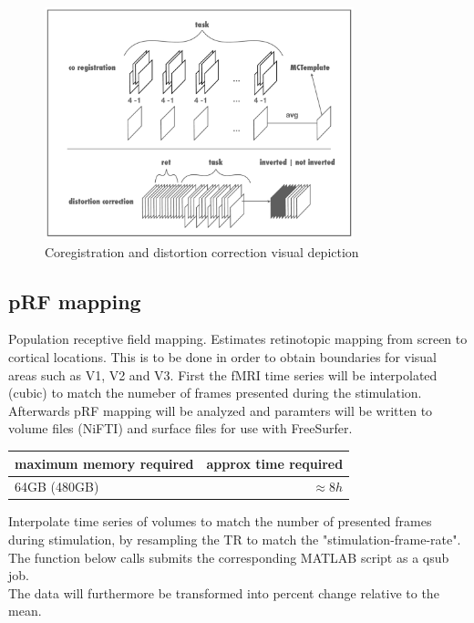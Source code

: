 \documentclass[12pt,a4paper]{scrartcl}
\begin{document}
\begin{figure}
\begin{center}
\includegraphics[width=0.8\textwidth]{coregdist}
\caption[Coregistration and distortion correction visual depiction]{Coregistration and distortion correction visual depiction}
\end{center}
\label{fig:coregdist}
\end{figure}

\subsection{pRF mapping}
Population receptive field mapping. Estimates retinotopic mapping from screen to cortical locations. This is to be done in order to obtain boundaries for visual areas such as V1, V2 and V3. First the fMRI time series will be interpolated (cubic) to match the numeber of frames presented during the stimulation. Afterwards pRF mapping will be analyzed and paramters will be written to volume files (NiFTI) and surface files for use with FreeSurfer.
\begin{table}[h]
\begin{tabular}{l | r}
\toprule
maximum memory required & approx time required\\\toprule
64GB (480GB) & $\approx 8h$ \\\bottomrule
\end{tabular}
\end{table}
\FloatBarrier
\noindent Interpolate time series of volumes to match the number of presented frames during stimulation, by resampling the TR to match the "stimulation-frame-rate". The function below calls submits the corresponding MATLAB script as a qsub job.\\
The data will furthermore be transformed into percent change relative to the mean.\\
\end{document}
